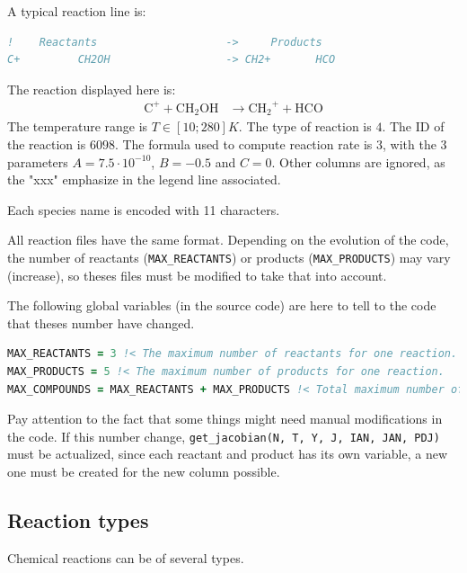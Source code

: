 \documentclass[english,a4paper,twoside]{article}
\begin{document}
A typical reaction line is:
\begin{lstlisting}[language=Fortran]
!    Reactants                    ->     Products                                                A          B          C      xxxxxxxxxxxxxxxxxxxxx ITYPE Tmin   Tmax formula ID xxxxx
C+         CH2OH                  -> CH2+       HCO                                           7.500E-10 -5.000E-01  0.000E+00 0.00e+00 0.00e+00   NA  4     10    280  3  6098 1  1
\end{lstlisting}
The reaction displayed here is:
\begin{align*}
\mathrm{C^+} + \mathrm{CH_2OH} &\rightarrow \mathrm{CH_2}^+ + \mathrm{HCO}
\end{align*}
The temperature range is $T\in[10;280]\unit{K}$. The type of reaction is $4$. The ID of the reaction is $6098$. The formula used to compute reaction rate is $3$, with the 3 parameters $A=7.5\cdot 10^{-10}$, $B=-0.5$ and $C=0$. Other columns are ignored, as the "xxx" emphasize in the legend line associated.

\bigskip

Each species name is encoded with 11 characters.

All reaction files have the same format. Depending on the evolution of the code, the number of reactants (\verb|MAX_REACTANTS|) or products (\verb|MAX_PRODUCTS|) may vary (increase), so theses files must be modified to take that into account. 

The following global variables (in the source code) are here to tell to the code that theses number have changed. 
\begin{lstlisting}[language=Fortran]
MAX_REACTANTS = 3 !< The maximum number of reactants for one reaction.
MAX_PRODUCTS = 5 !< The maximum number of products for one reaction.
MAX_COMPOUNDS = MAX_REACTANTS + MAX_PRODUCTS !< Total maximum number of compounds for one reaction (reactants + products)
\end{lstlisting}

\begin{attention}
Pay attention to the fact that some things might need manual modifications in the code. If this number change, \verb|get_jacobian(N, T, Y, J, IAN, JAN, PDJ)| must be actualized, since each reactant and product has its own variable, a new one must be created for the new column possible. 
\end{attention}

\subsection{Reaction types}
Chemical reactions can be of several types. 
\end{document}
